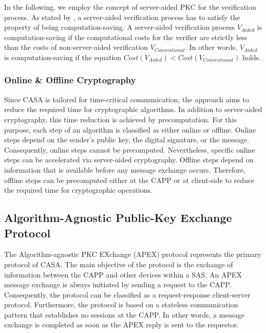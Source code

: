 In the following, we employ the concept of server-aided PKC for the verification process.
As stated by \citeauthor{Wu2008} \cite{Wu2008}, a server-aided verification process has to satisfy the property of being computation-saving.
A server-aided verification process $V_{Aided}$ is computation-saving if the computational costs for the verifier are strictly less than the costs of non-server-aided verification $V_{Conventional}$.
In other words, $V_{Aided}$ is computation-saving if the equation $Cost(V_{Aided}) < Cost(V_{Conventional})$ holds.

\subsubsection{Online \& Offline Cryptography}
Since CASA is tailored for time-critical communication, the approach aims to reduce the required time for cryptographic algorithms.
In addition to server-aided cryptography, this time reduction is achieved by precomputation.
For this purpose, each step of an algorithm is classified as either online or offline.
Online steps depend on the sender's public key, the digital signature, or the message.
Consequently, online steps cannot be precomputed.
Nevertheless, specific online steps can be accelerated via server-aided cryptography.
Offline steps depend on information that is available before any message exchange occurs.
Therefore, offline steps can be precomputed either at the CAPP or at client-side to reduce the required time for cryptographic operations.

\subsection{Algorithm-Agnostic Public-Key Exchange Protocol}
The Algorithm-agnostic PKC EXchange (APEX) protocol represents the primary protocol of CASA.
The main objective of the protocol is the exchange of information between the CAPP and other devices within a SAS.
An APEX message exchange is always initiated by sending a request to the CAPP.
Consequently, the protocol can be classified as a request-response client-server protocol.
Furthermore, the protocol is based on a stateless communication pattern that establishes no sessions at the CAPP.
In other words, a message exchange is completed as soon as the APEX reply is sent to the requestor.

